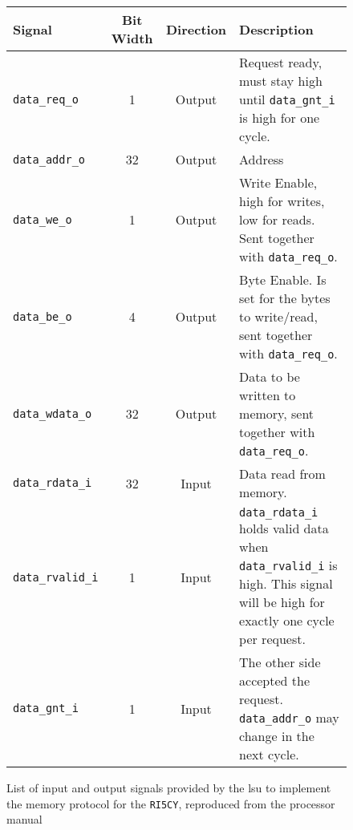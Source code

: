 \begin{figure}[htbp]
	\renewcommand{\arraystretch}{1.4}
	\begin{tabular}{lccp{8cm}}
		\hline
		\textbf{Signal} & \textbf{Bit Width} &\textbf{Direction} & \textbf{Description} \\
		\hline
		\texttt{data\_req\_o}
& 1 & Output & Request ready, must stay high until \texttt{data\_gnt\_i} is high for one cycle. \\
		\texttt{data\_addr\_o} & 32 & Output & Address \\
	  	\texttt{data\_we\_o}
& 1 & Output & Write Enable, high for writes, low for reads. Sent together with \texttt{data\_req\_o}. \\
	  	\texttt{data\_be\_o} & 4 & Output & Byte Enable. Is set for the bytes to write/read, sent together with \texttt{data\_req\_o}. \\
	  	\texttt{data\_wdata\_o} & 32
& Output & Data to be written to memory, sent together with \texttt{data\_req\_o}. \\
	  	\texttt{data\_rdata\_i} & 32 & Input & Data read from memory. \\
		\texttt{data\_rvalid\_i} & 1 & Input & \texttt{data\_rdata\_i} holds valid data when \texttt{data\_rvalid\_i} is high. This signal will be high for exactly one cycle per request. \\
		\texttt{data\_gnt\_i} & 1 & Input & The other side accepted the request. \texttt{data\_addr\_o} may change in the next cycle. \\
		\hline
	\end{tabular}
\caption{List of input and output signals provided by the \gls{lsu} to implement the memory protocol for the \texttt{RI5CY}, reproduced from the processor manual \cite{andreastraberRI5CYUserManual2017}}
\label{fig:signal-table}
\end{figure}

